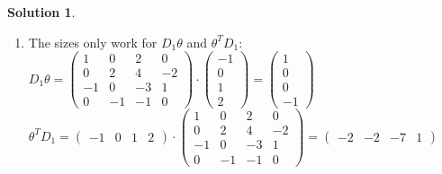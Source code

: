 \documentclass[11pt]{article}
\theoremstyle{definition}
\theoremstyle{nopunct}
\newtheorem*{s}{Solution}
\begin{document}
\begin{s}
\begin{enumerate}
        \item The sizes only work for $D_1 \theta$ and $\theta^T D_1$:
        \bigskip\\
        $
            D_1 \theta =
            \begin{pmatrix}
                1 & 0 & 2 & 0 \\ 
                0 & 2 & 4 & -2 \\ 
                -1 & 0 & -3 & 1 \\ 
                0 & -1 & -1 & 0
            \end{pmatrix} \cdot 
            \begin{pmatrix}
                -1 \\ 
                0 \\ 
                1 \\ 
                2 
            \end{pmatrix}
            =
            \begin{pmatrix}
                1 \\ 
                0 \\ 
                0 \\ 
                -1 
            \end{pmatrix}
        $
        \bigskip\\
        $
            \theta^T D_1 =
            \begin{pmatrix}
                -1 &
                0 &
                1 &
                2 
            \end{pmatrix}
            \cdot 
            \begin{pmatrix}
                1 & 0 & 2 & 0 \\ 
                0 & 2 & 4 & -2 \\ 
                -1 & 0 & -3 & 1 \\ 
                0 & -1 & -1 & 0
            \end{pmatrix} 
            =
            \begin{pmatrix}
                -2 &
                -2 &
                -7 &
                1 
            \end{pmatrix}
        $
    \end{enumerate}
\end{s}
\end{document}
